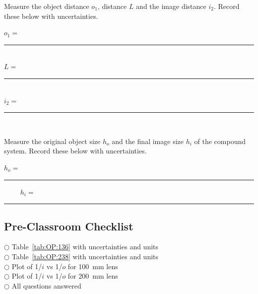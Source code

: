 \noindent Measure the object distance $o_1$, distance $L$ and the image distance $i_2$. Record these below
with uncertainties.

\begin{center}
$o_1=$~\rule{3cm}{.1mm}\\
\vspace*{.5cm}
$L=$~\rule{3cm}{.1mm}\\
\vspace*{.5cm}
$i_2=$~\rule{3cm}{.1mm}\\
\end{center}




\vspace*{.5cm}
\noindent
Measure the original object size $h_o$ and the final image size $h_i$ 
of the compound system.
Record these below with uncertainties.

\begin{center}
$h_o=$~\rule{3cm}{.1mm} ~~~~
$h_i=$~\rule{3cm}{.1mm}
\end{center}


\subsection{Pre-Classroom Checklist}

$\bigcirc$ \hspace*{1cm} Table~\ref{tab:OP:136} with uncertainties and units \\
$\bigcirc$ \hspace*{1cm} Table~\ref{tab:OP:238} with uncertainties and units \\
$\bigcirc$ \hspace*{1cm} Plot of 1/$i$ vs 1/$o$ for 100~mm lens \\
$\bigcirc$ \hspace*{1cm} Plot of 1/$i$ vs 1/$o$ for 200~mm lens \\
$\bigcirc$ \hspace*{1cm} All questions answered 

